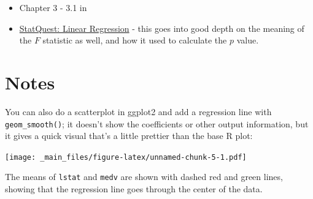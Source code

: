 \documentclass[
]{book}
\newenvironment{Shaded}{\begin{snugshade}}{\end{snugshade}}
\newcommand{\AttributeTok}[1]{\textcolor[rgb]{0.77,0.63,0.00}{#1}}
\newcommand{\FloatTok}[1]{\textcolor[rgb]{0.00,0.00,0.81}{#1}}
\newcommand{\FunctionTok}[1]{\textcolor[rgb]{0.00,0.00,0.00}{#1}}
\newcommand{\NormalTok}[1]{#1}
\newcommand{\SpecialCharTok}[1]{\textcolor[rgb]{0.00,0.00,0.00}{#1}}
\newcommand{\StringTok}[1]{\textcolor[rgb]{0.31,0.60,0.02}{#1}}
\providecommand{\tightlist}{%
  \setlength{\itemsep}{0pt}\setlength{\parskip}{0pt}}
\begin{document}
\begin{itemize}
\tightlist
\item
  Chapter 3 - 3.1 in \citet{ISLR}
\item
  \href{https://www.youtube.com/watch?v=nk2CQITm_eo}{StatQuest: Linear Regression} - this goes into good depth on the meaning of the \(F\) statistic as well, and how it used to calculate the \(p\) value.
\end{itemize}

\hypertarget{notes}{%
\section{Notes}\label{notes}}

You can also do a scatterplot in ggplot2 and add a regression line with \texttt{geom\_smooth()}; it doesn't show the coefficients or other output information, but it gives a quick visual that's a little prettier than the base R plot:

\begin{Shaded}
\end{Shaded}

\texttt{[image: \_main\_files/figure-latex/unnamed-chunk-5-1.pdf]}

The means of \texttt{lstat} and \texttt{medv} are shown with dashed red and green lines, showing that the regression line goes through the center of the data.
\end{document}

